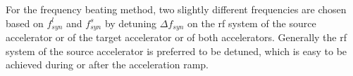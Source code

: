 %
For the frequency beating method, two slightly different frequencies are chosen based on $f_{\mathit{syn}}^{l}$ and $f_{\mathit{syn}}^{s}$ by detuning $\Delta f_\mathit{syn}$ on the rf system of the source accelerator or of the target accelerator or of both accelerators. Generally the rf system of the source accelerator is preferred to be detuned, which is easy to be achieved during or after the acceleration ramp. 


